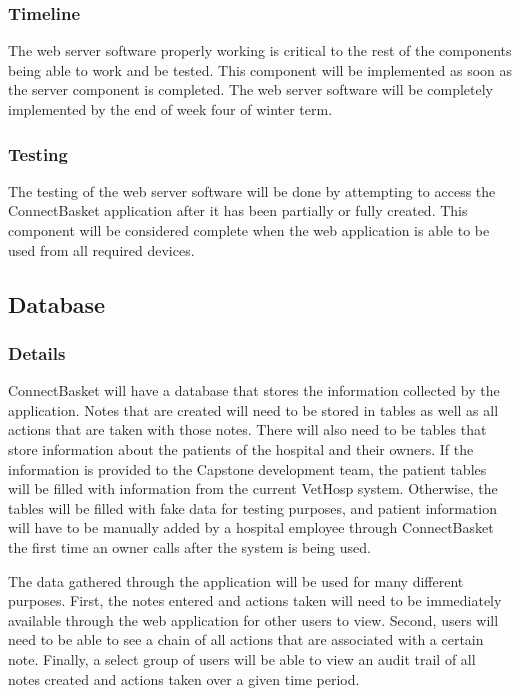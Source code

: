 \documentclass[onecolumn, draftclsnofoot,10pt, compsoc]{IEEEtran}
\begin{document}
\subsubsection{Timeline}
The web server software properly working is critical to the rest of the components being able to work and be tested. This component will be implemented as soon as the server component is completed. The web server software will be completely implemented by the end of week four of winter term.

\subsubsection{Testing}
The testing of the web server software will be done by attempting to access the ConnectBasket application after it has been partially or fully created. This component will be considered complete when the web application is able to be used from all required devices.


\subsection{Database}

\subsubsection{Details}
ConnectBasket will have a database that stores the information collected by the application. Notes that are created will need to be stored in tables as well as all actions that are taken with those notes. There will also need to be tables that store information about the patients of the hospital and their owners. If the information is provided to the Capstone development team, the patient tables will be filled with information from the current VetHosp system. Otherwise, the tables will be filled with fake data for testing purposes, and patient information will have to be manually added by a hospital employee through ConnectBasket the first time an owner calls after the system is being used.

The data gathered through the application will be used for many different purposes. First, the notes entered and actions taken will need to be immediately available through the web application for other users to view. Second, users will need to be able to see a chain of all actions that are associated with a certain note. Finally, a select group of users will be able to view an audit trail of all notes created and actions taken over a given time period.
\end{document}
